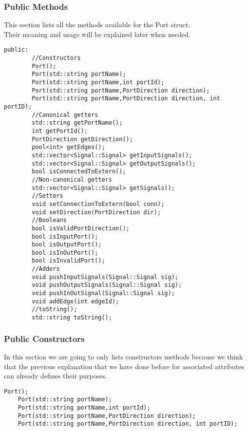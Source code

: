 \documentclass{article}
\begin{document}
\subsubsection{Public Methods}

This section lists all the methods available for the Port struct.\\
Their meaning and usage will be explained later when needed.\\

\begin{mdframed}[hidealllines=true, backgroundcolor=magenta!10]
	\begin{lstlisting}[basicstyle=\tiny]
	public:
		//Constructors
		Port();
		Port(std::string portName);
		Port(std::string portName,int portId);
		Port(std::string portName,PortDirection direction);
		Port(std::string portName,PortDirection direction, int portID);
		//Canonical getters
		std::string getPortName();
		int getPortId();
		PortDirection getDirection();
		pool<int> getEdges();
		std::vector<Signal::Signal> getInputSignals();
		std::vector<Signal::Signal> getOutputSignals();
		bool isConnectedToExtern();
		//Non-canonical getters
		std::vector<Signal::Signal> getSignals();
		//Setters
		void setConnectionToExtern(bool conn);
		void setDirection(PortDirection dir);
		//Booleans
		bool isValidPortDirection();
		bool isInputPort();
		bool isOutputPort();
		bool isInOutPort();
		bool isInvalidPort();
		//Adders
		void pushInputSignals(Signal::Signal sig);
		void pushOutputSignals(Signal::Signal sig);
		void pushInOutSignal(Signal::Signal sig);
		void addEdge(int edgeId);
		//toString();
		std::string toString();
	\end{lstlisting}
\end{mdframed}

\subsubsection{Public Constructors}

In this section we are going to only lists constructors methods because we think that 
the previous explanation that we have done before for associated attributes can already defines their purposes.\\

\begin{mdframed}[hidealllines=true, backgroundcolor=magenta!10]
	\begin{lstlisting}[basicstyle=\tiny]
	Port();
	Port(std::string portName);
	Port(std::string portName,int portId);
	Port(std::string portName,PortDirection direction);
	Port(std::string portName,PortDirection direction, int portID);
	\end{lstlisting}
\end{mdframed}
\end{document}
